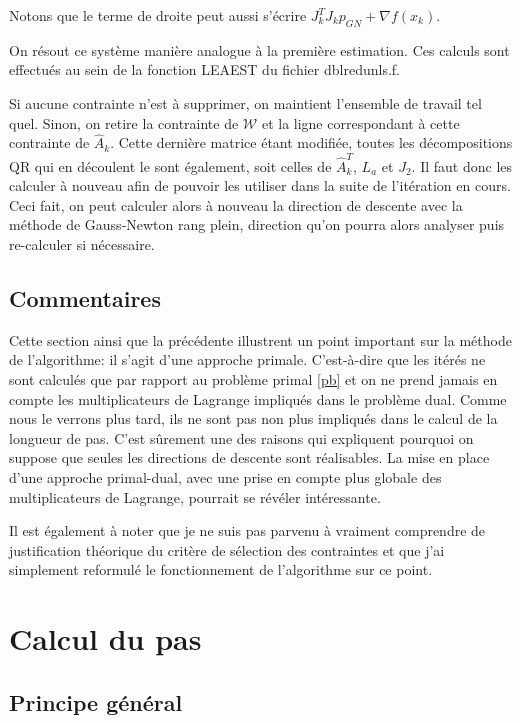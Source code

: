 \documentclass[a4paper,11pt]{article}
\newcommand{\ha}{\hat{A}}
\numberwithin{equation}{section}
\begin{document}
Notons que le terme de droite peut aussi s'écrire $J_{k}^{T}J_{k}p_{GN} + \nabla f(x_{k})$.

On résout ce système manière analogue à la première estimation. Ces calculs sont effectués au sein de la fonction LEAEST du fichier dblredunls.f.


Si aucune contrainte n'est à supprimer, on maintient l'ensemble de travail tel quel. Sinon, on retire la contrainte de $\mathcal{W}$ et la ligne correspondant à cette contrainte de $\ha_{k}$. Cette dernière matrice étant modifiée, toutes les décompositions QR qui en découlent le sont également, soit celles de $\ha_{k}^{T}$, $L_{a}$ et $J_{2}$. Il faut donc les calculer à nouveau afin de pouvoir les utiliser dans la suite de l'itération en cours. Ceci fait, on peut calculer alors à nouveau la direction de descente avec la méthode de Gauss-Newton rang plein, direction qu'on pourra alors analyser puis re-calculer si nécessaire.

\subsection{Commentaires}

Cette section ainsi que la précédente illustrent un point important sur la méthode de l'algorithme: il s'agit d'une approche primale. C'est-à-dire que les itérés ne sont calculés que par rapport au problème primal \eqref{pb} et on ne prend jamais en compte les multiplicateurs de Lagrange impliqués dans le problème dual. Comme nous le verrons plus tard, ils ne sont pas non plus impliqués dans le calcul de la longueur de pas. C'est sûrement une des raisons qui expliquent pourquoi on suppose que seules les directions de descente sont réalisables. La mise en place d'une approche primal-dual, avec une prise en compte plus globale des multiplicateurs de Lagrange, pourrait se révéler intéressante.

Il est également à noter que je ne suis pas parvenu à vraiment comprendre de justification théorique du critère de sélection des contraintes et que j'ai simplement reformulé le fonctionnement de l'algorithme sur ce point.

\section{Calcul du pas}

\subsection{Principe général}
\end{document}
